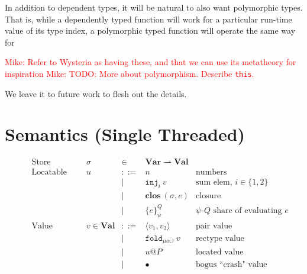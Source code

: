 \documentclass[10pt]{article}
\makeatletter
\newcommand{\kw}[1]{\ensuremath{\mathtt{#1}}}
\newcommand{\trec}[2]{\ensuremath{\mu {#1}.{#2}}}
\newcommand{\einj}[2]{\ensuremath{\kw{inj}_{#1}~{#2}}}
\newcommand{\epair}[2]{\ensuremath{\langle {#1}, {#2} \rangle}}
\newcommand{\efold}[2]{\ensuremath{\kw{fold}_{#1}~{#2}}}
\newcommand{\vshare}[3]{\ensuremath{\{{#3}\}^{#1}_{#2}}}
\newcommand{\vloc}[2]{\ensuremath{{#1}\kw{@}{#2}}}
\newcommand{\vclos}[2]{\ensuremath{\mathbf{clos}~({#1},{#2})}}
\newcommand{\vcrash}{\ensuremath{\bullet}}
\newcommand{\env}{\ensuremath{\sigma}}
\newcommand{\mwh}[1]{\textcolor{red}{Mike: #1}}
\makeatother
\begin{document}
In addition to dependent types, it will be natural to also want
polymorphic types. That is, while a dependently typed function will
work for a particular run-time value of its type index, a polymorphic
typed function will operate the same way for 

\mwh{Refer to Wysteria as having these, and that we can use its
  metatheory for inspiration}
\mwh{TODO: More about polymorphism. Describe \texttt{this}.}

We leave it to future work to flesh out the details. 

\section{Semantics (Single Threaded)}
\label{sec:STsemantics}

\begin{figure}
  \[\begin{array}{rlcll}
      \text{Store} & \sigma & \in & \mathbf{Var} \rightharpoonup \mathbf{Val}\\
      \text{Locatable value} & u & ::=  & n & \text{numbers} \\
                             && \mid & \einj{i}{v} & \text{sum elem, }i \in \{1,2\}\\
                             && \mid & \vclos{\env}{e}  & \text{closure} \\
                             && \mid & \vshare{Q}{\psi}{e} & \text{$\psi$-$Q$ share of evaluating $e$} \\
      \text{Value} & v  \in \mathbf{Val} & ::=  & \epair{v_1}{v_2} & \text{pair value}\\
                       && \mid & \efold{\trec{\alpha}{\tau}}{v} & \text{rectype value}\\
                   && \mid & \vloc{u}{P} & \text{located value}\\
                   && \mid & \vcrash & \text{bogus ``crash" value}\\
    \end{array}
  \]


\end{figure}
\end{document}
